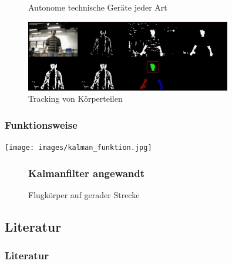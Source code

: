 \documentclass[10pt,a4paper,oneside]{beamer}
\begin{document}
\begin{frame}
\begin{figure}[htbp]
\begin{minipage}{0.3\textwidth}
          \caption{Autonome technische Geräte jeder Art}
        \end{minipage}\hfill
        \begin{minipage}{0.3\textwidth}
         \centering
          \includegraphics[width=0.8\textwidth]{images/head-tracking.jpg}
          \caption{Tracking von Körperteilen}
        \end{minipage}
      \end{figure}
\end{frame}
\begin{frame}
  \frametitle{Funktionsweise}
   \texttt{[image: images/kalman\_funktion.jpg]}
\end{frame}
\begin{frame}
\begin{figure}
	\frametitle{Kalmanfilter angewandt}
\hfil
{}\hfil
\caption{Flugkörper auf gerader Strecke}
\end{figure}

\end{frame}

\begin{frame}[allowframebreaks]
  \section{Literatur}
  \frametitle{Literatur}
	\printbibliography

\end{frame}
\end{document}
